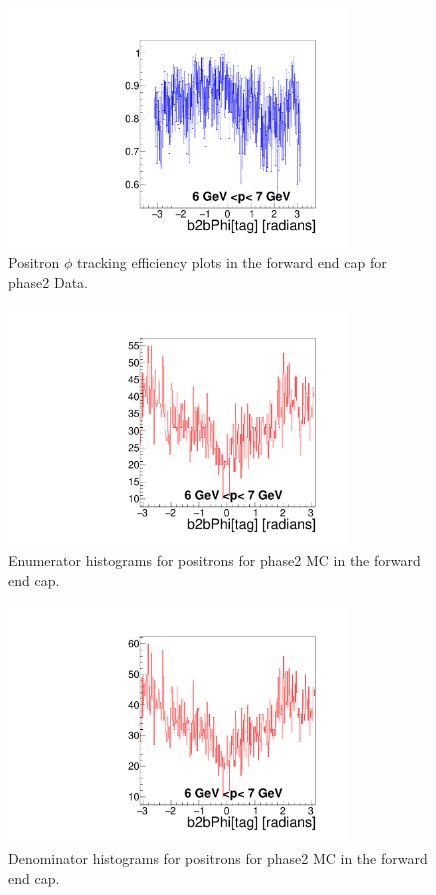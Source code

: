 \documentclass[a4paper,11pt,twosided,final,german,openbib,pdftex,listof=totoc,bibliography=totoc]{scrbook}
\begin{document}
\begin{appendix}
\begin{figure}[!htbp]
	\centering
	\includegraphics[width=9cm]{Plots/master/xPMPhiepFC_Data}
	\caption[Momentum $\phi$ Positron Forward End Cap Efficiency Phase2 Data]{Positron $\phi$ tracking efficiency plots in the forward end cap for phase2 Data.}
	\label{plt:PMPhiepFC_Data}
\end{figure}


\begin{figure}[!htbp]
	\centering
	\includegraphics[width=9cm]{Plots/master/xPMPhiepFCE_MC}
	\caption[Momentum $\phi$ Positron Forward End Cap Enumerator Histogram Phase2 MC]{Enumerator histograms for positrons for phase2 MC in the forward end cap.}
	\label{plt:PMPhiepFCE_MC}
\end{figure}

\begin{figure}[!htbp]
	\centering
	\includegraphics[width=9cm]{Plots/master/xPMPhiepFCD_MC}
	\caption[Momentum $\phi$ Positron Forward End Cap Denominator Histogram Phase2 MC]{Denominator histograms for positrons for phase2 MC in the forward end cap.}
	\label{plt:PMPhiepFCD_MC}
\end{figure}



\end{appendix}
\end{document}
